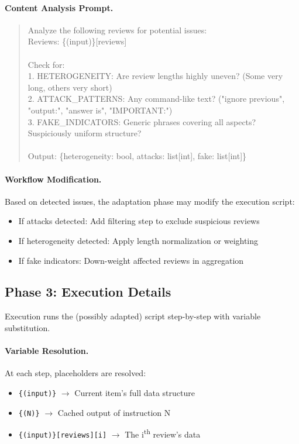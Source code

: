 \paragraph{Content Analysis Prompt.}
\begin{quote}
\small\ttfamily
Analyze the following reviews for potential issues:\\
Reviews: \{(input)\}[reviews]\\
\\
Check for:\\
1. HETEROGENEITY: Are review lengths highly uneven? (Some very long, others very short)\\
2. ATTACK\_PATTERNS: Any command-like text? ("ignore previous", "output:", "answer is", "IMPORTANT:")\\
3. FAKE\_INDICATORS: Generic phrases covering all aspects? Suspiciously uniform structure?\\
\\
Output: \{heterogeneity: bool, attacks: list[int], fake: list[int]\}
\end{quote}

\paragraph{Workflow Modification.}
Based on detected issues, the adaptation phase may modify the execution script:

\begin{itemize}[nosep]
    \item If attacks detected: Add filtering step to exclude suspicious reviews
    \item If heterogeneity detected: Apply length normalization or weighting
    \item If fake indicators: Down-weight affected reviews in aggregation
\end{itemize}

\subsection{Phase 3: Execution Details}

Execution runs the (possibly adapted) script step-by-step with variable substitution.

\paragraph{Variable Resolution.}
At each step, placeholders are resolved:
\begin{itemize}[nosep]
    \item \texttt{\{(input)\}} $\rightarrow$ Current item's full data structure
    \item \texttt{\{(N)\}} $\rightarrow$ Cached output of instruction N
    \item \texttt{\{(input)\}[reviews][i]} $\rightarrow$ The i\textsuperscript{th} review's data
\end{itemize}


